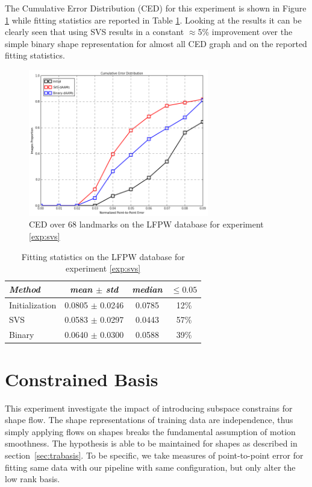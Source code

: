 The Cumulative Error Distribution (CED) for this experiment is shown in Figure \ref{fig:svs_ced} while fitting statistics are reported in Table \ref{tab:svs_stats}. Looking at the results it can be clearly seen that using SVS results in a constant $\approx$5\% improvement over the simple binary shape representation for almost all CED graph and on the reported fitting statistics.

\begin{figure}[h]
\centering
\includegraphics[width=0.7\textwidth]{resources/Fig_SVS/svs_ced}
\caption{CED over 68 landmarks on the LFPW database for experiment \ref{exp:svs}}
\label{fig:svs_ced}
\end{figure}

\begin{table}[h]
\small
\centering
\begin{tabular}{|l|c|c|c|}
\hline
\emph{Method}       & \emph{mean $\pm$ std} & \emph{median} & $\leq 0.05$\\
\hline\hline
Initialization      & 0.0805 $\pm$ 0.0246 & 0.0785 & 12\%\\
SVS                 & 0.0583 $\pm$ 0.0297 & 0.0443 & 57\%\\
Binary              & 0.0640 $\pm$ 0.0300 & 0.0588 & 39\%\\
\hline
\end{tabular}
\caption{Fitting statistics on the LFPW database for experiment \ref{exp:svs}}
\label{tab:svs_stats}
\end{table}

\section{Constrained Basis}
\label{exp:basis}

This experiment investigate the impact of introducing subspace constrains for shape flow. The shape representations of training data are independence, thus simply applying flows on shapes breaks the fundamental assumption of motion smoothness. The hypothesis is able to be maintained for shapes as described in section~\ref{sec:trabasis}. To be specific, we take measures of point-to-point error for fitting same data with our pipeline with same configuration, but only alter the low rank basis. 

